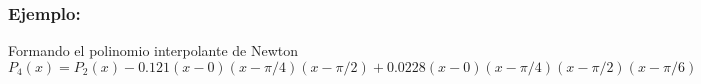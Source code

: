 \documentclass[10pt]{beamer}
\begin{document}
{
\frametitle{Ejemplo:}
Formando el polinomio interpolante de Newton
\scriptsize
$$
P_4(x) = P_2(x) - 0.121(x-0)(x-\pi/4)(x-\pi/2)+ 0.0228(x-0)(x-\pi/4)(x-\pi/2)(x-\pi/6)
$$
}
\end{document}
